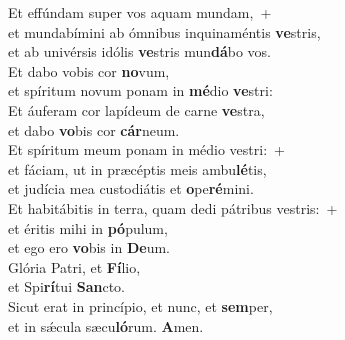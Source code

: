 \evenverse Et effúndam super vos aquam mundam,~+\\\evenverse  et mundabímini ab ómnibus inquinaméntis \textbf{ve}stris,~\*\\
\evenverse et ab univérsis idólis \textbf{ve}stris mun\textbf{dá}bo vos.\\
\oddverse Et dabo vobis cor \textbf{no}vum,~\*\\
\oddverse et spíritum novum ponam in \textbf{mé}dio \textbf{ve}stri:\\
\evenverse Et áuferam cor lapídeum de carne \textbf{ve}stra,~\*\\
\evenverse et dabo \textbf{vo}bis cor \textbf{cár}neum.\\
\oddverse Et spíritum meum ponam in médio vestri:~+\\
\oddverse  et fáciam, ut in præcéptis meis ambu\textbf{lé}tis,~\*\\
\oddverse et judícia mea custodiátis et \textbf{o}pe\textbf{ré}mini.\\
\evenverse Et habitábitis in terra, quam dedi pátribus vestris:~+\\
\evenverse  et éritis mihi in \textbf{pó}pulum,~\*\\
\evenverse et ego ero \textbf{vo}bis in \textbf{De}um.\\
\oddverse Glória Patri, et \textbf{Fí}lio,~\*\\
\oddverse et Spi\textbf{rí}tui \textbf{San}cto.\\
\evenverse Sicut erat in princípio, et nunc, et \textbf{sem}per,~\*\\
\evenverse et in sǽcula sæcu\textbf{ló}rum. \textbf{A}men.\\
